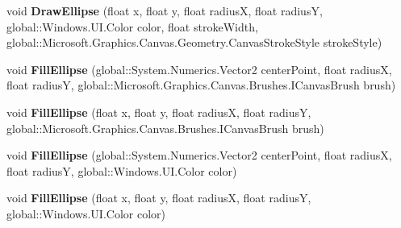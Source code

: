 \begin{DoxyCompactItemize}
\item 
\mbox{\label{interface_microsoft_1_1_graphics_1_1_canvas_1_1_i_canvas_drawing_session_a2e393965452b8dbbd7b71729b4efa2bd}} 
void {\bfseries Draw\+Ellipse} (float x, float y, float radiusX, float radiusY, global\+::\+Windows.\+U\+I.\+Color color, float stroke\+Width, global\+::\+Microsoft.\+Graphics.\+Canvas.\+Geometry.\+Canvas\+Stroke\+Style stroke\+Style)
\item 
\mbox{\label{interface_microsoft_1_1_graphics_1_1_canvas_1_1_i_canvas_drawing_session_a39c562b825f33cb1d1e4908f8ef599f0}} 
void {\bfseries Fill\+Ellipse} (global\+::\+System.\+Numerics.\+Vector2 center\+Point, float radiusX, float radiusY, global\+::\+Microsoft.\+Graphics.\+Canvas.\+Brushes.\+I\+Canvas\+Brush brush)
\item 
\mbox{\label{interface_microsoft_1_1_graphics_1_1_canvas_1_1_i_canvas_drawing_session_aa9ac0d4c464494caf2c2e34570ebd4c8}} 
void {\bfseries Fill\+Ellipse} (float x, float y, float radiusX, float radiusY, global\+::\+Microsoft.\+Graphics.\+Canvas.\+Brushes.\+I\+Canvas\+Brush brush)
\item 
\mbox{\label{interface_microsoft_1_1_graphics_1_1_canvas_1_1_i_canvas_drawing_session_a99d27e62079c68b5810ea610d71051db}} 
void {\bfseries Fill\+Ellipse} (global\+::\+System.\+Numerics.\+Vector2 center\+Point, float radiusX, float radiusY, global\+::\+Windows.\+U\+I.\+Color color)
\item 
\mbox{\label{interface_microsoft_1_1_graphics_1_1_canvas_1_1_i_canvas_drawing_session_a5b40f04edde1afbb326d55b6d88062f9}} 
void {\bfseries Fill\+Ellipse} (float x, float y, float radiusX, float radiusY, global\+::\+Windows.\+U\+I.\+Color color)
\item 
\mbox{\label{interface_microsoft_1_1_graphics_1_1_canvas_1_1_i_canvas_drawing_session_ab2f4ba74043603bdaffdd3f323940ca7}} 

\end{DoxyCompactItemize}
